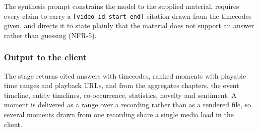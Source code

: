 The synthesis prompt constrains the model to the supplied material, requires every claim
to carry a \texttt{[video\_id start-end]} citation drawn from the timecodes given, and
directs it to state plainly that the material does not support an answer rather than
guessing (NFR-5).

\subsubsection*{Output to the client}

The stage returns cited answers with timecodes, ranked moments with playable time ranges
and playback URLs, and from the aggregates chapters, the event timeline, entity
timelines, co-occurrence, statistics, novelty and sentiment. A moment is delivered as a
range over a recording rather than as a rendered file, so several moments drawn from one
recording share a single media load in the client.
